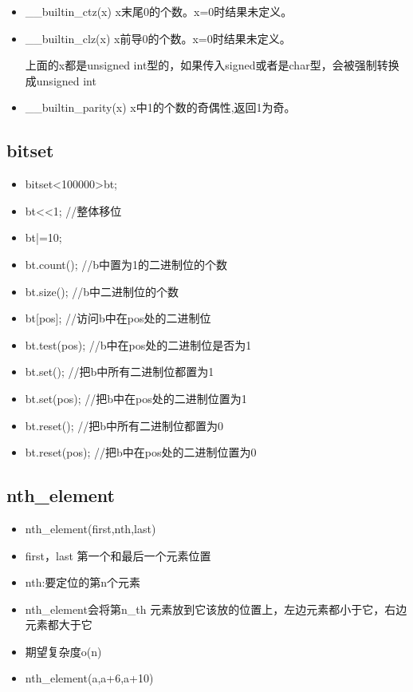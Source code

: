 \documentclass[a4paper,13.6pt]{article}
\begin{document}
\begin{CJK}{UTF8}{gbsn}
\begin{itemize}
\item \_\_builtin\_ctz(x)  x末尾0的个数。x=0时结果未定义。

\item \_\_builtin\_clz(x)  x前导0的个数。x=0时结果未定义。

上面的x都是unsigned int型的，如果传入signed或者是char型，会被强制转换成unsigned int

\item \_\_builtin\_parity(x)  x中1的个数的奇偶性,返回1为奇。
\end{itemize}

\subsection{bitset} 
\begin{itemize}
\item bitset<100000>bt;
\item bt<<1; //整体移位
\item bt|=10;
\item bt.count(); //b中置为1的二进制位的个数
\item bt.size(); //b中二进制位的个数
\item bt[pos]; //访问b中在pos处的二进制位
\item bt.test(pos); //b中在pos处的二进制位是否为1
\item bt.set(); //把b中所有二进制位都置为1
\item bt.set(pos); //把b中在pos处的二进制位置为1
\item bt.reset(); //把b中所有二进制位都置为0
\item bt.reset(pos); //把b中在pos处的二进制位置为0
\end{itemize}

\subsection{nth\_element} 
\begin{itemize}
\item nth\_element(first,nth,last)
\item first，last 第一个和最后一个元素位置
\item nth:要定位的第n个元素
\item nth\_element会将第n\_th 元素放到它该放的位置上，左边元素都小于它，右边元素都大于它
\item 期望复杂度o(n)
\item  nth\_element(a,a+6,a+10)
\end{itemize}


\end{CJK}
\end{document}
